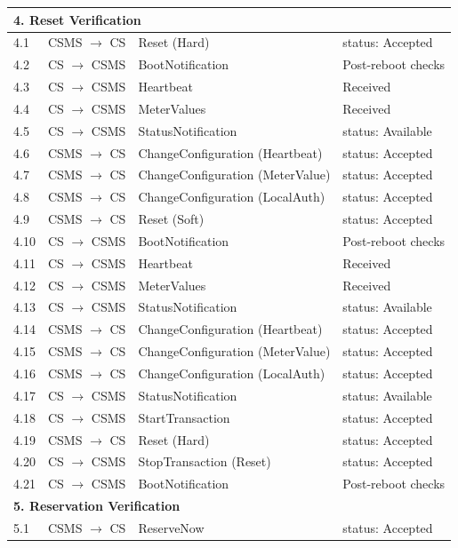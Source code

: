 \documentclass[a4paper,11pt]{report}
\begin{document}
\begin{footnotesize}
\begin{longtable}{|p{1.2cm}|p{2.5cm}|p{5.5cm}|p{6cm}|}
\multicolumn{4}{|l|}{\textbf{4. Reset Verification}} \\
\hline
4.1 & CSMS $\to$ CS & Reset (Hard) & status: Accepted \\
\hline
4.2 & CS $\to$ CSMS & BootNotification & Post-reboot checks \\
\hline
4.3 & CS $\to$ CSMS & Heartbeat & Received \\
\hline
4.4 & CS $\to$ CSMS & MeterValues & Received \\
\hline
4.5 & CS $\to$ CSMS & StatusNotification & status: Available \\
\hline
4.6 & CSMS $\to$ CS & ChangeConfiguration (Heartbeat) & status: Accepted \\
\hline
4.7 & CSMS $\to$ CS & ChangeConfiguration (MeterValue) & status: Accepted \\
\hline
4.8 & CSMS $\to$ CS & ChangeConfiguration (LocalAuth) & status: Accepted \\
\hline
4.9 & CSMS $\to$ CS & Reset (Soft) & status: Accepted \\
\hline
4.10 & CS $\to$ CSMS & BootNotification & Post-reboot checks \\
\hline
4.11 & CS $\to$ CSMS & Heartbeat & Received \\
\hline
4.12 & CS $\to$ CSMS & MeterValues & Received \\
\hline
4.13 & CS $\to$ CSMS & StatusNotification & status: Available \\
\hline
4.14 & CSMS $\to$ CS & ChangeConfiguration (Heartbeat) & status: Accepted \\
\hline
4.15 & CSMS $\to$ CS & ChangeConfiguration (MeterValue) & status: Accepted \\
\hline
4.16 & CSMS $\to$ CS & ChangeConfiguration (LocalAuth) & status: Accepted \\
\hline
4.17 & CS $\to$ CSMS & StatusNotification & status: Available \\
\hline
4.18 & CS $\to$ CSMS & StartTransaction & status: Accepted \\
\hline
4.19 & CSMS $\to$ CS & Reset (Hard) & status: Accepted \\
\hline
4.20 & CS $\to$ CSMS & StopTransaction (Reset) & status: Accepted \\
\hline
4.21 & CS $\to$ CSMS & BootNotification & Post-reboot checks \\
\hline
\multicolumn{4}{|l|}{\textbf{5. Reservation Verification}} \\
\hline
5.1 & CSMS $\to$ CS & ReserveNow & status: Accepted \\

\end{longtable}
\end{footnotesize}
\end{document}
